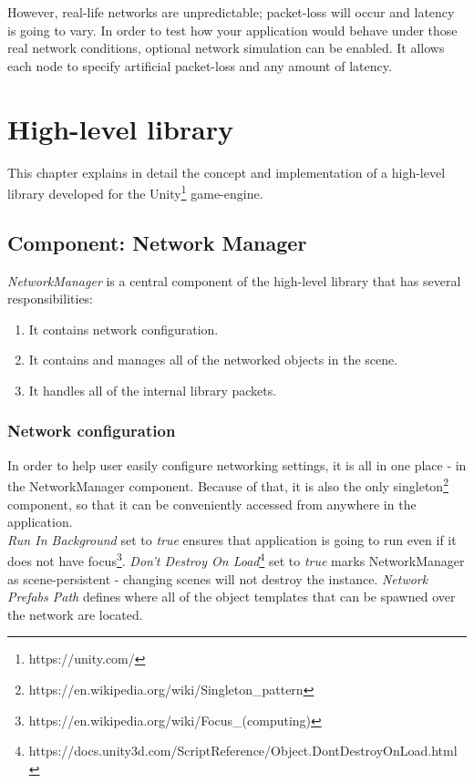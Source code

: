 \documentclass[times, utf8, diplomski]{fer}
\begin{document}
However, real-life networks are unpredictable; packet-loss will occur and latency is going to vary. In order to test how your application would behave under those real network conditions, optional network simulation can be enabled. It allows each node to specify artificial packet-loss and any amount of latency.


\chapter{High-level library}
This chapter explains in detail the concept and implementation of a high-level library developed for the Unity\footnote{https://unity.com/} game-engine.

\section{Component: Network Manager}
\textit{NetworkManager} is a central component of the high-level library that has several responsibilities:

\begin{enumerate}
	\item It contains network configuration.
	\item It contains and manages all of the networked objects in the scene.
	\item It handles all of the internal library packets.
\end{enumerate}

\subsection{Network configuration}
In order to help user easily configure networking settings, it is all in one place - in the NetworkManager component. Because of that, it is also the only singleton\footnote{https://en.wikipedia.org/wiki/Singleton\_pattern} component, so that it can be conveniently accessed from anywhere in the application.\\

\textit{Run In Background} set to \textit{true} ensures that application is going to run even if it does not have focus\footnote{https://en.wikipedia.org/wiki/Focus\_(computing)}. \textit{Don't Destroy On Load}\footnote{https://docs.unity3d.com/ScriptReference/Object.DontDestroyOnLoad.html} set to \textit{true} marks NetworkManager as scene-persistent - changing scenes will not destroy the instance. \textit{Network Prefabs Path} defines where all of the object templates that can be spawned over the network are located.\\
\end{document}
